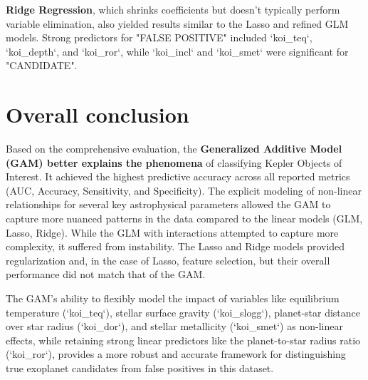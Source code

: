 \textbf{Ridge Regression}, which shrinks coefficients but doesn't typically perform variable elimination, also yielded results similar to the Lasso and refined GLM models. Strong predictors for "FALSE POSITIVE" included `koi\_teq`, `koi\_depth`, and `koi\_ror`, while `koi\_incl` and `koi\_smet` were significant for "CANDIDATE".

\section{Overall conclusion}
Based on the comprehensive evaluation, the \textbf{Generalized Additive Model (GAM) better explains the phenomena} of classifying Kepler Objects of Interest. It achieved the highest predictive accuracy across all reported metrics (AUC, Accuracy, Sensitivity, and Specificity). The explicit modeling of non-linear relationships for several key astrophysical parameters allowed the GAM to capture more nuanced patterns in the data compared to the linear models (GLM, Lasso, Ridge). While the GLM with interactions attempted to capture more complexity, it suffered from instability. The Lasso and Ridge models provided regularization and, in the case of Lasso, feature selection, but their overall performance did not match that of the GAM.

The GAM's ability to flexibly model the impact of variables like equilibrium temperature (`koi\_teq`), stellar surface gravity (`koi\_slogg`), planet-star distance over star radius (`koi\_dor`), and stellar metallicity (`koi\_smet`) as non-linear effects, while retaining strong linear predictors like the planet-to-star radius ratio (`koi\_ror`), provides a more robust and accurate framework for distinguishing true exoplanet candidates from false positives in this dataset.
